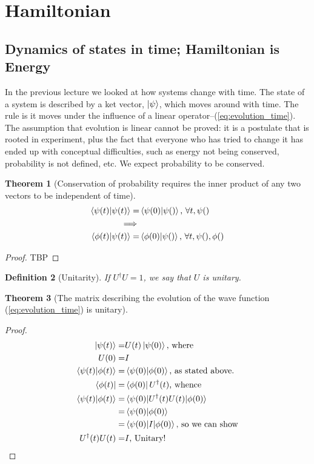 \documentclass[]{article}
\newtheorem{thm}{Theorem}
\newtheorem{defn}[thm]{Definition}
\begin{document}
\section{Hamiltonian}

\subsection{Dynamics of states in time; Hamiltonian is Energy}
In the previous lecture we looked at how systems change with time. The state of a system is described by a ket vector, $\ket{\psi}$, which moves around with time. The rule is it moves under the influence of a linear operator--(\ref{eq:evolution_time}). The assumption that evolution is linear cannot be proved: it is a postulate that is rooted in experiment, plus the fact that everyone who has tried to change it has ended up with conceptual difficulties, such as energy not being conserved, probability is not defined, etc. We expect probability to be conserved.

\begin{thm}[Conservation of probability requires the inner product of any two vectors to be independent of time]
	\begin{align*}
		\braket{\psi(t)\vert \psi(t)} =& \braket{\psi(0)\vert \psi()} \text{, $\forall t, \psi()$}\\
		\implies&\\
		\braket{\phi(t)\vert \psi(t)} =& \braket{\phi(0)\vert \psi()} \text{, $\forall t, \psi(), \phi()$}
	\end{align*}
\end{thm}
\begin{proof}
	TBP
\end{proof}
\begin{defn}[Unitarity]
	If $U^\dagger U=1$, we say that $U$ is unitary.
\end{defn}

\begin{thm}[The matrix describing the evolution of the wave function (\ref{eq:evolution_time}) is unitary]
\end{thm}
\begin{proof}
	\begin{align*}
		\ket{\psi(t)} =& U(t) \ket{\psi(0)} \text{, where} \\
		U(0) =& I\\
		\braket{\psi(t)\vert\phi(t)} =& \braket{\psi(0)\vert\phi(0)} \text{, as stated above.}\\
		\bra{\phi(t)} =& \bra{\phi(0)} U^\dagger(t) \text{, whence}\\
		\braket{\psi(t)\vert\phi(t)} =& \braket{\psi(0)\vert U^\dagger(t) U(t)\vert\phi(0)}\\
		=& \braket{\psi(0)\vert\phi(0)} \\
		=& \braket{\psi(0)\vert I \vert \phi(0)} \text{, so we can show}\\
		U^\dagger(t) U(t)=& I \text {, Unitary!}
	\end{align*}
\end{proof}
\end{document}
